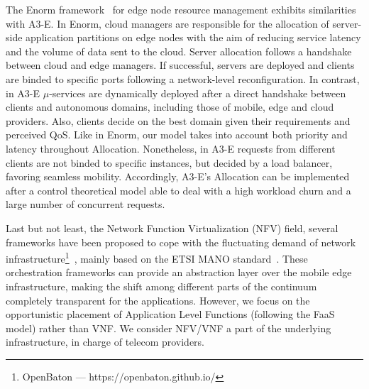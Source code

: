 The Enorm framework~\cite{wang2017enorm} for edge node resource management exhibits similarities with A3-E. In Enorm, cloud managers are responsible for the allocation of server-side application partitions on edge nodes with the aim of reducing service latency and the volume of data sent to the cloud. Server allocation follows a handshake between cloud and edge managers. If successful, servers are deployed and clients are binded to specific ports following a network-level reconfiguration. In contrast, in A3-E $\mu$-services are dynamically deployed after a direct handshake between clients and autonomous domains, including those of mobile, edge and cloud providers. Also, clients decide on the best domain given their requirements and perceived QoS. Like in Enorm, our model takes into account both priority and latency throughout Allocation. Nonetheless, in A3-E requests from different clients are not binded to specific instances, but decided by a load balancer, favoring seamless mobility. Accordingly, A3-E's Allocation can be implemented after a control theoretical model able to deal with a high workload churn and a large number of concurrent requests. 

Last but not least, the Network Function Virtualization (NFV) field, several frameworks have been proposed to cope with the fluctuating demand of network infrastructure\footnote{OpenBaton --- https://openbaton.github.io/}~\cite{cloudify14}, mainly based on the ETSI MANO standard~\cite{etsimano17}. These orchestration frameworks can provide an abstraction layer over the mobile edge infrastructure, making the shift among different parts of the continuum completely transparent for the applications. However, we focus on the opportunistic placement of Application Level Functions (following the FaaS model) rather than VNF. We consider NFV/VNF a part of the underlying infrastructure, in charge of telecom providers.



